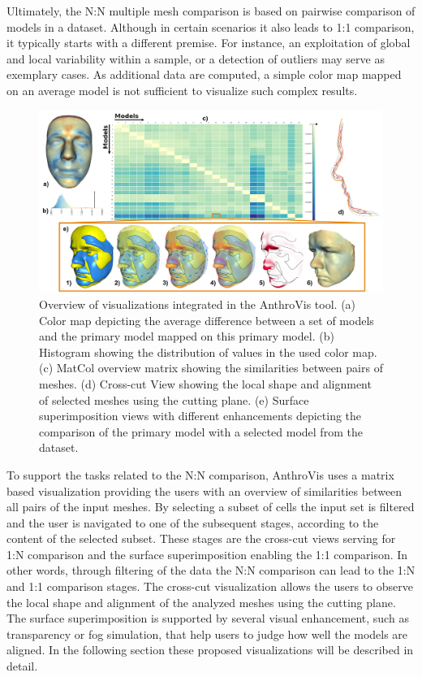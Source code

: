 \documentclass[final,5p,times]{elsarticle}
\begin{document}
Ultimately, the N:N multiple mesh comparison is based on pairwise comparison of models in a dataset. 
Although in certain scenarios it also leads to 1:1 comparison, it typically starts with a different premise.
For instance, an exploitation of global and local variability within a sample, or a detection of outliers may serve as exemplary cases.
As additional data are computed, a simple color map mapped on an average model is not sufficient to visualize such complex results.

\begin{figure}[htb]
	\centering
  \includegraphics[width=1.0\linewidth]{pictures/overview.png}
  \caption{\label{fig:overview}Overview of visualizations integrated in the AnthroVis tool. (a) Color map depicting the average difference between a set of models and the primary model mapped on this primary model. (b) Histogram showing the distribution of values in the used color map. (c) MatCol overview matrix showing the similarities between pairs of meshes. (d) Cross-cut View showing the local shape and alignment of selected meshes using the cutting plane. (e) Surface superimposition views with different enhancements depicting the comparison of the primary model with a selected model from the dataset.}
\end{figure}

To support the tasks related to the N:N comparison, AnthroVis uses a matrix based visualization providing the users with an overview of similarities between all pairs of the input meshes.
By selecting a subset of cells the input set is filtered and the user is navigated to one of the subsequent stages, according to the content of the selected subset.
These stages are the cross-cut views serving for 1:N comparison and the surface superimposition enabling the 1:1 comparison.
In other words, through filtering of the data the N:N comparison can lead to the 1:N and 1:1 comparison stages.
The cross-cut visualization allows the users to observe the local shape and alignment of the analyzed meshes using the cutting plane.
The surface superimposition is supported by several visual enhancement, such as transparency or fog simulation, that help users to judge how well the models are aligned.
In the following section these proposed visualizations will be described in detail.
\end{document}
